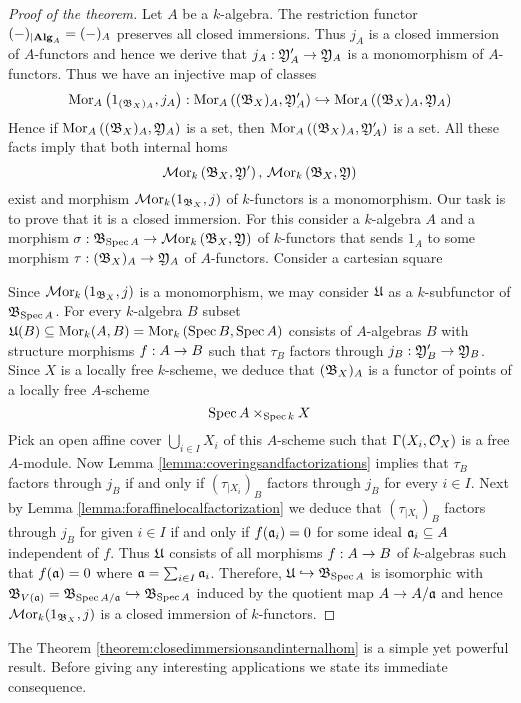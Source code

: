 \begin{proof}[Proof of the theorem]
Let $A$ be a $k$-algebra. The restriction functor $(-)_{\mid \mathbf{Alg}_A} = (-)_A$ preserves all closed immersions. Thus $j_A$ is a closed immersion of $A$-functors and hence we derive that $j_A:{\mathfrak Y}'_A\rightarrow {\mathfrak Y}_A$ is a monomorphism of $A$-functors. Thus we have an injective  map of classes
$$\mathrm{Mor}_A\left(1_{({\mathfrak B}_X)_A},j_A\right):\mathrm{Mor}_A\left(({\mathfrak B}_X)_A,{\mathfrak Y}'_A\right)\hookrightarrow \mathrm{Mor}_A\left(({\mathfrak B}_X)_A,{\mathfrak Y}_A\right)$$
Hence if $\mathrm{Mor}_A\left(({\mathfrak B}_X)_A,{\mathfrak Y}_A\right)$ is a set, then $\mathrm{Mor}_A\left(({\mathfrak B}_X)_A,{\mathfrak Y}'_A\right)$ is a set. All these facts imply that both internal homs
$$\mathcal{M}\mathrm{or}_k\left({\mathfrak B}_X,{\mathfrak Y}'\right),\,\mathcal{M}\mathrm{or}_k\left({\mathfrak B}_X,{\mathfrak Y}\right)$$
exist and morphism $\mathcal{M}\mathrm{or}_k(1_{{\mathfrak B}_X},j)$ of $k$-functors is a monomorphism. Our task is to prove that it is a closed immersion. For this consider a $k$-algebra $A$ and a morphism $\sigma:{\mathfrak B}_{\mathrm{Spec}\, A}\rightarrow \mathcal{M}\mathrm{or}_k\left({\mathfrak B}_X,{\mathfrak Y}\right)$ of $k$-functors that sends $1_A$ to some morphism $\tau:({\mathfrak B}_X)_A\rightarrow {\mathfrak Y}_A$ of $A$-functors. Consider a cartesian square
\begin{center}
\end{center}
Since $\mathcal{M}\mathrm{or}_k\left(1_{{\mathfrak B}_X},j\right)$ is a monomorphism, we may consider ${\mathfrak U}$ as a $k$-subfunctor of ${\mathfrak B}_{\mathrm{Spec}\, A}$. For every $k$-algebra $B$ subset ${\mathfrak U}(B)\subseteq \mathrm{Mor}_k(A,B)= \mathrm{Mor}_k\left(\mathrm{Spec}\, B,\mathrm{Spec}\, A\right)$ consists of $A$-algebras $B$ with structure morphisms $f:A\rightarrow B$ such that $\tau_B$ factors through $j_B:{\mathfrak Y}'_B\rightarrow {\mathfrak Y}_B$. Since $X$ is a locally free $k$-scheme, we deduce that $({\mathfrak B}_{X})_A$ is a functor of points of a locally free $A$-scheme
$$\mathrm{Spec}\, A\times_{\mathrm{Spec}\, k}X$$
Pick an open affine cover $\bigcup_{i\in I}X_i$ of this $A$-scheme such that $\Gamma(X_i,{\mathcal O}_X)$ is a free $A$-module. Now Lemma \ref{lemma:coveringsandfactorizations} implies that $\tau_B$ factors through $j_B$ if and only if $\left(\tau_{\mid X_i}\right)_B$ factors through $j_B$ for every $i\in I$. Next by Lemma \ref{lemma:foraffinelocalfactorization} we deduce that $\left(\tau_{\mid X_i}\right)_B$  factors through $j_B$ for given $i\in I$ if and only if $f(\mathfrak{a}_i)=0$ for some ideal $\mathfrak{a}_i\subseteq A$ independent of $f$. Thus ${\mathfrak U}$ consists of all morphisms $f:A\rightarrow B$ of $k$-algebras such that $f(\mathfrak{a})=0$ where $\mathfrak{a} = \sum_{i\in I}\mathfrak{a}_i$. Therefore, ${\mathfrak U}\hookrightarrow {\mathfrak B}_{\mathrm{Spec}\, A}$ is isomorphic with ${\mathfrak B}_{V(\mathfrak{a})} = {\mathfrak B}_{\mathrm{Spec}\, A/\mathfrak{a}}\hookrightarrow {\mathfrak B}_{\mathrm{Spec}\, A}$ induced by the quotient map $A\rightarrow A/\mathfrak{a}$ and hence $\mathcal{M}\mathrm{or}_k(1_{{\mathfrak B}_X},j)$ is a closed immersion of $k$-functors.
\end{proof}
\noindent
The Theorem \ref{theorem:closedimmersionsandinternalhom} is a simple yet powerful result. Before giving any interesting applications we state its immediate consequence.

\small




